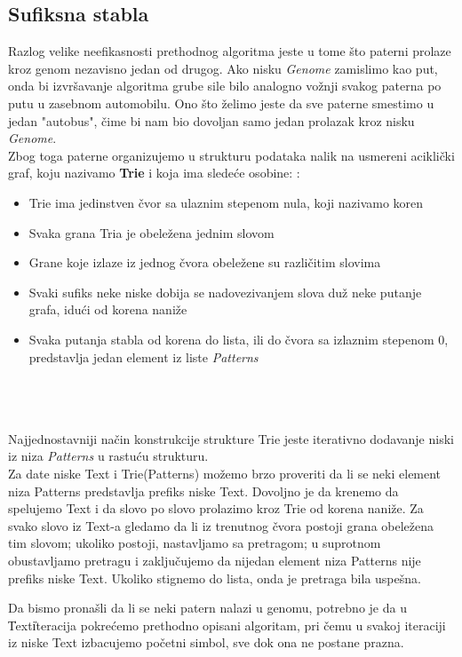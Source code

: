 \subsection{Sufiksna stabla}
Razlog velike neefikasnosti prethodnog algoritma jeste u tome što paterni prolaze kroz genom nezavisno jedan od drugog. Ako nisku \textit{Genome} zamislimo kao put, onda bi izvršavanje algoritma grube sile bilo analogno vožnji svakog paterna po putu u zasebnom automobilu. Ono što želimo jeste da sve paterne smestimo u jedan "autobus", čime bi nam bio dovoljan samo jedan prolazak kroz nisku \textit{Genome}. 
\\Zbog toga paterne organizujemo u strukturu podataka nalik na usmereni aciklički graf, koju nazivamo \textbf{Trie} i koja ima sledeće osobine:
:
\begin{itemize}
    \item Trie ima jedinstven čvor sa ulaznim stepenom nula, koji nazivamo koren
    \item Svaka grana Tria je obeležena jednim slovom
    \item Grane koje izlaze iz jednog čvora obeležene su različitim slovima
    \item Svaki sufiks neke niske dobija se nadovezivanjem slova duž neke putanje grafa, idući od korena naniže
    \item Svaka putanja stabla od korena do lista, ili do čvora sa izlaznim stepenom 0, predstavlja jedan element iz liste \textit{Patterns}
\end{itemize}

\\\\\\
Najjednostavniji način konstrukcije strukture Trie jeste iterativno dodavanje niski iz niza \textit{Patterns} u rastuću strukturu.
\\

Za date niske Text i Trie(Patterns) možemo brzo proveriti da li se neki element niza Patterns predstavlja prefiks niske Text. Dovoljno je da krenemo da spelujemo Text i da slovo po slovo prolazimo kroz Trie od korena naniže. Za svako slovo iz Text-a gledamo da li iz trenutnog čvora postoji grana obeležena tim slovom; ukoliko postoji, nastavljamo sa pretragom; u suprotnom obustavljamo pretragu i zaključujemo da nijedan element niza Patterns nije prefiks niske Text. Ukoliko stignemo do lista, onda je pretraga bila uspešna.

Da bismo pronašli da li se neki patern nalazi u genomu, potrebno je da u \|Text\| iteracija pokrećemo prethodno opisani algoritam, pri čemu u svakoj iteraciji iz niske Text izbacujemo početni simbol, sve dok ona ne postane prazna.


